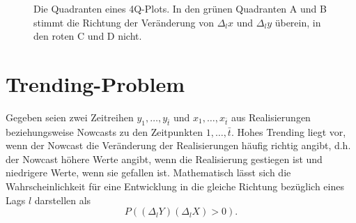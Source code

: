 \documentclass{article}
\theoremstyle{plain}%
\theoremstyle{definition}
\newcommand{\lag}[1][l]{\Delta_{#1}}
\newcommand{\tmax}{\bar{t}}
\begin{document}
\begin{figure}
	\centering
{}
\caption{Die Quadranten eines 4Q-Plots. In den grünen Quadranten A und B stimmt die Richtung der Veränderung von $\lag x$ und $\lag y$ überein, in den roten C und D nicht.}
\label{fig:quadranten}
\end{figure}


\section{Trending-Problem}


Gegeben seien zwei Zeitreihen $y_1, \dots, y_{\tmax}$ und $x_1, \dots, x_{\tmax}$ aus Realisierungen beziehungsweise Nowcasts zu den Zeitpunkten $1, \dots, \tmax$. 
Hohes Trending liegt vor, wenn der Nowcast die Veränderung der Realisierungen häufig richtig angibt, d.h. der Nowcast höhere Werte angibt, wenn die Realisierung gestiegen ist und niedrigere Werte, wenn sie gefallen ist. 
Mathematisch lässt sich die Wahrscheinlichkeit für eine Entwicklung in die gleiche Richtung bezüglich eines Lags $l$ darstellen als
\begin{equation}
  P((\lag Y) (\lag X) > 0). \label{eq:concordance}
\end{equation}
\end{document}
